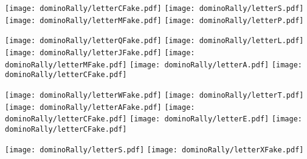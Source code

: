\begin{puzzle}
\begin{center}
  \texttt{[image: dominoRally/letterCFake.pdf]}\hspace{0.03\linewidth}
  \texttt{[image: dominoRally/letterS.pdf]}\hspace{0.03\linewidth}
  \texttt{[image: dominoRally/letterMFake.pdf]}\hspace{0.03\linewidth}
  \texttt{[image: dominoRally/letterP.pdf]}\hspace{0.03\linewidth}
\end{center}
\begin{center}
  \texttt{[image: dominoRally/letterQFake.pdf]}\hspace{0.03\linewidth}
  \texttt{[image: dominoRally/letterL.pdf]}\hspace{0.03\linewidth}
  \texttt{[image: dominoRally/letterJFake.pdf]}\hspace{0.03\linewidth}
  \texttt{[image: dominoRally/letterMFake.pdf]}\hspace{0.03\linewidth}
  \texttt{[image: dominoRally/letterA.pdf]}\hspace{0.03\linewidth}
  \texttt{[image: dominoRally/letterCFake.pdf]}\hspace{0.03\linewidth}
\end{center}
\begin{center}
  \texttt{[image: dominoRally/letterWFake.pdf]}\hspace{0.03\linewidth}
  \texttt{[image: dominoRally/letterT.pdf]}\hspace{0.03\linewidth}
  \texttt{[image: dominoRally/letterAFake.pdf]}\hspace{0.03\linewidth}
  \texttt{[image: dominoRally/letterCFake.pdf]}\hspace{0.03\linewidth}
  \texttt{[image: dominoRally/letterE.pdf]}\hspace{0.03\linewidth}
  \texttt{[image: dominoRally/letterCFake.pdf]}\hspace{0.03\linewidth}
\end{center}
\begin{center}
  \texttt{[image: dominoRally/letterS.pdf]}\hspace{0.03\linewidth}
  \texttt{[image: dominoRally/letterXFake.pdf]}\hspace{0.03\linewidth}

\end{center}
\end{puzzle}
